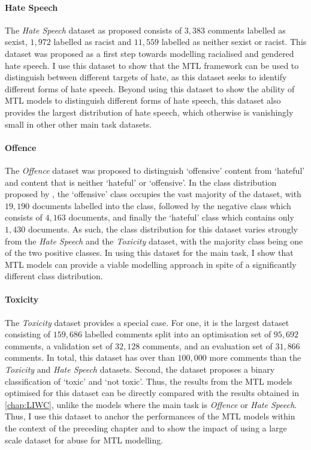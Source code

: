 \paragraph{Hate Speech}
The \textit{Hate Speech} dataset \citep{Waseem-Hovy:2016} as proposed consists of $3,383$ comments labelled as sexist, $1,972$ labelled as racist and $11,559$ labelled as neither sexist or racist.
This dataset was proposed as a first step towards modelling racialised and gendered hate speech.
I use this dataset to show that the MTL framework can be used to distinguish between different targets of hate, as this dataset seeks to identify different forms of hate speech.
Beyond using this dataset to show the ability of MTL models to distinguish different forms of hate speech, this dataset also provides the largest distribution of hate speech, which otherwise is vanishingly small in other other main task datasets.

\paragraph{Offence}
The \textit{Offence} dataset \citep{Davidson:2017} was proposed to distinguish `offensive' content from `hateful' and content that is neither `hateful' or `offensive'.
In the class distribution proposed by \citet{Davidson:2017}, the `offensive' class occupies the vast majority of the dataset, with $19,190$ documents labelled into the class, followed by the negative class which consists of $4,163$ documents, and finally the `hateful' class which contains only $1,430$ documents.
As such, the class distribution for this dataset varies strongly from the \textit{Hate Speech} and the \textit{Toxicity} dataset, with the majority class being one of the two positive classes.
In using this dataset for the main task, I show that MTL models can provide a viable modelling approach in spite of a significantly different class distribution.

\paragraph{Toxicity}
The \textit{Toxicity} dataset \citep{Wulczyn:2017} provides a special case.
For one, it is the largest dataset consisting of $159,686$ labelled comments split into an optimisation set of $95,692$ comments, a validation set of $32,128$ comments, and an evaluation set of $31,866$ comments.
In total, this dataset has over than $100,000$ more comments than the \textit{Toxicity} and \textit{Hate Speech} datasets.
Second, the dataset proposes a binary classification of `toxic' and `not toxic'.
Thus, the results from the MTL models optimised for this dataset can be directly compared with the results obtained in \cref{chap:LIWC}, unlike the models where the main task is \textit{Offence} or \textit{Hate Speech}.
Thus, I use this dataset to anchor the performances of the MTL models within the context of the preceding chapter and to show the impact of using a large scale dataset for abuse for MTL modelling.

